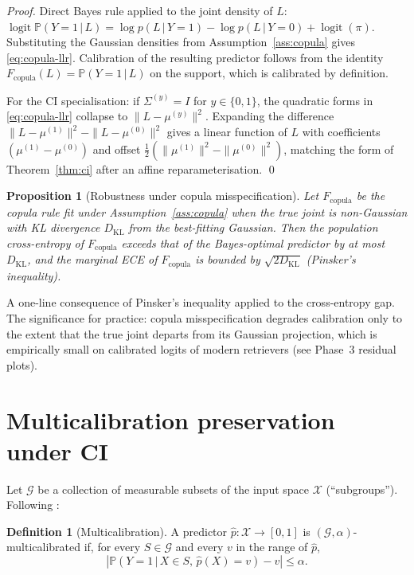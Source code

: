 \documentclass[11pt]{article}
\newtheorem{proposition}[theorem]{Proposition}
\theoremstyle{definition}
\newtheorem{definition}{Definition}
\theoremstyle{remark}
\newcommand{\pr}{\mathbb{P}}
\newcommand{\logit}{\operatorname{logit}}
\newcommand{\given}{\,\big|\,}
\begin{document}
\begin{proof}
Direct Bayes rule applied to the joint density of $L$:
$\logit \pr(Y=1 \given L) = \log p(L \given Y=1) - \log p(L \given Y=0) + \logit(\pi)$.
Substituting the Gaussian densities from Assumption~\ref{ass:copula}
gives \eqref{eq:copula-llr}. Calibration of the resulting predictor
follows from the identity $F_{\mathrm{copula}}(L) = \pr(Y=1 \given L)$
on the support, which is calibrated by definition.

For the CI specialisation: if $\Sigma^{(y)} = I$ for $y \in \{0,1\}$,
the quadratic forms in \eqref{eq:copula-llr} collapse to
$\|L - \mu^{(y)}\|^2$. Expanding the difference
$\|L - \mu^{(1)}\|^2 - \|L - \mu^{(0)}\|^2$ gives a linear function of
$L$ with coefficients $(\mu^{(1)} - \mu^{(0)})$ and offset
$\tfrac{1}{2}(\|\mu^{(1)}\|^2 - \|\mu^{(0)}\|^2)$, matching the form of
Theorem~\ref{thm:ci} after an affine reparameterisation. \qed
\end{proof}

\begin{proposition}[Robustness under copula misspecification]\label{prop:copula-robust}
Let $F_{\mathrm{copula}}$ be the copula rule fit under
Assumption~\ref{ass:copula} when the true joint is non-Gaussian
with KL divergence $D_{\mathrm{KL}}$ from the best-fitting Gaussian.
Then the population cross-entropy of $F_{\mathrm{copula}}$ exceeds
that of the Bayes-optimal predictor by at most $D_{\mathrm{KL}}$, and
the marginal ECE of $F_{\mathrm{copula}}$ is bounded by $\sqrt{2 D_{\mathrm{KL}}}$
(Pinsker's inequality).
\end{proposition}

A one-line consequence of Pinsker's inequality
\citep{pinsker1964information} applied to the cross-entropy gap. The
significance for practice: copula misspecification degrades
calibration only to the extent that the true joint departs from its
Gaussian projection, which is empirically small on calibrated logits
of modern retrievers (see Phase~3 residual plots).

\section{Multicalibration preservation under CI}\label{sec:multical}

Let $\mathcal{G}$ be a collection of measurable subsets of the input
space $\mathcal{X}$ (``subgroups''). Following
\citet{hkrr2018multicalibration}:

\begin{definition}[Multicalibration]
A predictor $\hat{p}: \mathcal{X} \to [0,1]$ is
$(\mathcal{G}, \alpha)$-multicalibrated if, for every $S \in \mathcal{G}$
and every $v$ in the range of $\hat{p}$,
\[
  \left| \pr(Y = 1 \given X \in S,\, \hat{p}(X) = v) - v \right| \leq \alpha.
\]
\end{definition}
\end{document}
